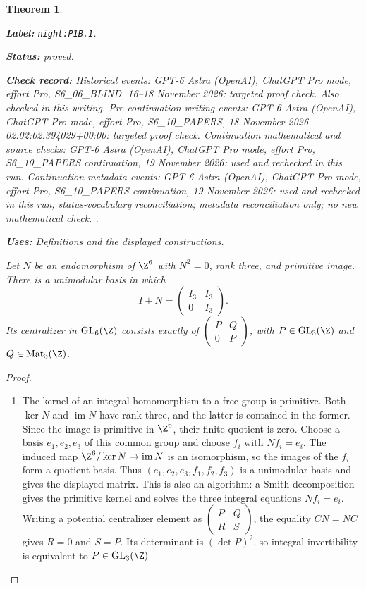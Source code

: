 \documentclass[11pt,a4paper]{article}
\newtheorem{theorem}{Theorem}[section]
\theoremstyle{definition}
\newcommand{\StatementRecord}[4]{\par\smallskip\begingroup\upshape\raggedright\noindent\textbf{Label:} \nolinkurl{#1}.\par\noindent\textbf{Status:} #2.\par\noindent\textbf{Check record:} #3.\par\noindent\textbf{Uses:} #4.\par\endgroup\smallskip}
\begin{document}
\begin{theorem}\label{night:P1B.1}
\StatementRecord{night:P1B.1}{proved}{Historical events: GPT-6 Astra (OpenAI), ChatGPT Pro mode, effort Pro, S6\_06\_BLIND, 16--18 November 2026: targeted proof check. Also checked in this writing. Pre-continuation writing events: GPT-6 Astra (OpenAI), ChatGPT Pro mode, effort Pro, S6\_10\_PAPERS, 18 November 2026 02:02:02.394029+00:00: targeted proof check. Continuation mathematical and source checks: GPT-6 Astra (OpenAI), ChatGPT Pro mode, effort Pro, S6\_10\_PAPERS continuation, 19 November 2026: used and rechecked in this run. Continuation metadata events: GPT-6 Astra (OpenAI), ChatGPT Pro mode, effort Pro, S6\_10\_PAPERS continuation, 19 November 2026: used and rechecked in this run; status-vocabulary reconciliation; metadata reconciliation only; no new mathematical check. }{Definitions and the displayed constructions}
Let $N$ be an endomorphism of $\Z^6$ with $N^2=0$, rank three,
and primitive image. There is a unimodular basis in which
\[
 I+N=\begin{pmatrix}I_3&I_3\\0&I_3\end{pmatrix}.
\]
Its centralizer in $\operatorname{GL}_6(\Z)$ consists exactly of
$\left(\begin{smallmatrix}P&Q\\0&P\end{smallmatrix}\right)$,
with $P\in\operatorname{GL}_3(\Z)$ and $Q\in\operatorname{Mat}_3(\Z)$.
\end{theorem}
\begin{proof}
\begin{enumerate}[label=\arabic*.]
\item The kernel of an integral homomorphism to a free group is
primitive. Both $\ker N$ and $\operatorname{im}N$ have rank three,
and the latter is contained in the former. Since the image is
primitive in $\Z^6$, their finite quotient is zero. Choose a basis
$e_1,e_2,e_3$ of this common group and choose $f_i$ with $Nf_i=e_i$.
The induced map $\Z^6/\ker N\to\operatorname{im}N$ is an
isomorphism, so the images of the $f_i$ form a quotient basis.
Thus $(e_1,e_2,e_3,f_1,f_2,f_3)$ is a unimodular basis and gives
the displayed matrix. This is also an algorithm: a Smith
decomposition gives the primitive kernel and solves the three
integral equations $Nf_i=e_i$.
Writing a potential centralizer element as
$\left(\begin{smallmatrix}P&Q\\R&S\end{smallmatrix}\right)$,
the equality $CN=NC$ gives $R=0$ and $S=P$.
Its determinant is $(\det P)^2$, so integral invertibility
is equivalent to $P\in\operatorname{GL}_3(\Z)$.

\end{enumerate}
\end{proof}
\end{document}
